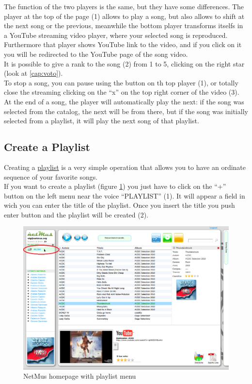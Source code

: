 The function of the two players is the same, but they have some differences.
The player at the top of the page (1) allows to play a song, but also
allows to shift at the next song or the previous, meanwhile the bottom player
transforms itselfs in a YouTube streaming video player, where your selected song
is reproduced. Furthermore that player shows YouTube link to the video, and if
you click on it you will be redirected to the YouTube page of the song video.\\
It is possible to give a rank to the song (2) from 1 to 5, clicking on the right
star (look at \ref{cap:voto}).\\

To stop a song, you can pause using the button on th top player (1), or totally
close the streaming clicking on the ``x'' on the top right corner of the video
(3).\\

At the end of a song, the player will automatically play the next: if the song
was selected from the catalog, the next will be from there, but if the song was
initially selected from a playlist, it will play the next song of that
playlist.\\

\subsection{Create a Playlist}

Creating a \underline{playlist} is a very simple operation that allows you to
have an ordinate sequence of your favorite songs.\\
If you want to create a playlist (figure \ref{fig:playlist}) you just have to
click on the ``+'' button on the left menu near the voice ``PLAYLIST'' (1). It
will appear a field in wich you can enter the title of the playlist. Once you insert the title you push
enter button and the playlist will be created (2).\\

\begin{figure}[!htbp]
  \centering
  \includegraphics[width=15cm]{img/MU/new_playlist.png}
\caption{NetMus homepage with playlist menu}
\label{fig:playlist}
\end{figure}


